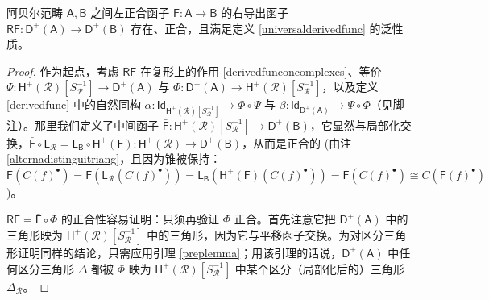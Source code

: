 \begin{Thm}\label{derivedfuncisexact}
	阿贝尔范畴 $\mathsf{A}, \mathsf{B}$ 之间左正合函子 $\mathsf{F}:\mathsf{A}\rightarrow\mathsf{B}$ 的右导出函子 $\mathsf{RF}:\mathsf{D^+(A)}\rightarrow\mathsf{D^+(B)}$ 存在、正合，且满足定义 \ref{universalderivedfunc} 的泛性质。
\end{Thm}

\begin{proof}
	作为起点，考虑 $\mathsf{RF}$ 在复形上的作用 \eqref{derivedfunconcomplexes}、等价 $\Psi:\mathsf{H^+(\mathcal{R})}[S_\mathcal{R}^{-1}]\rightarrow\mathsf{D^+(A)}$ 与 $\Phi:\mathsf{D^+(A)}\rightarrow\mathsf{H^+(\mathcal{R})}[S_\mathcal{R}^{-1}]$，以及定义 \ref{derivedfunc} 中的自然同构 $\alpha:\mathsf{Id}_{\mathsf{H^+(\mathcal{R})}[S_\mathcal{R}^{-1}]}\rightarrow\Phi\circ\Psi$ 与 $\beta:\mathsf{Id}_{\mathsf{D^+(A)}}\rightarrow\Psi\circ\Phi$（见脚注）。那里我们定义了中间函子 $\bar{\mathsf{F}}:\mathsf{H^+(\mathcal{R})}[S_\mathcal{R}^{-1}]\rightarrow\mathsf{D^+(B)}$，它显然与局部化交换，$\bar{\mathsf{F}}\circ\mathsf{L_\mathcal{R}}=\mathsf{L_B}\circ\mathsf{H^+(F)}:\mathsf{H^+(\mathcal{R})}\rightarrow\mathsf{D^+(B)}$，从而是正合的 \big(由注 \ref{alternadistinguitriang}，且因为锥被保持：$\bar{\mathsf{F}}(C(f)^\bullet)=\bar{\mathsf{F}}(\mathsf{L_\mathcal{R}}(C(f)^\bullet))=\mathsf{L_B}(\mathsf{H^+(F)}(C(f)^\bullet))=\mathsf{F}(C(f)^\bullet)\cong C(\mathsf{F}(f)^\bullet)$\big)。
	
	$\mathsf{RF}=\bar{\mathsf{F}}\circ\Phi$ 的正合性容易证明：只须再验证 $\Phi$ 正合。首先注意它把 $\mathsf{D^+(A)}$ 中的三角形映为 $\mathsf{H^+(\mathcal{R})}[S_\mathcal{R}^{-1}]$ 中的三角形，因为它与平移函子交换。为对区分三角形证明同样的结论，只需应用引理 \ref{preplemma}；用该引理的话说，$\mathsf{D^+(A)}$ 中任何区分三角形 $\Delta$ 都被 $\Phi$ 映为 $\mathsf{H^+(\mathcal{R})}[S_\mathcal{R}^{-1}]$ 中某个区分（局部化后的）三角形 $\Delta_\mathcal{R}$。
	

\end{proof}
